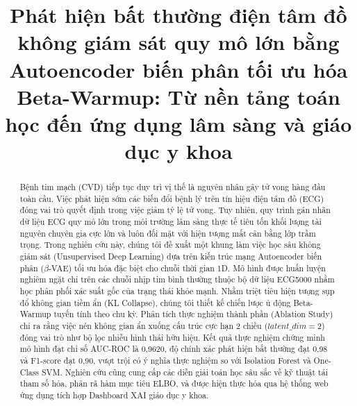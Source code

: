 \documentclass[conference]{IEEEtran}
\begin{document}
\title{Phát hiện bất thường điện tâm đồ không giám sát quy mô lớn bằng Autoencoder biến phân tối ưu hóa Beta-Warmup: Từ nền tảng toán học đến ứng dụng lâm sàng và giáo dục y khoa}

\author{
}

\maketitle

\begin{abstract}
Bệnh tim mạch (CVD) tiếp tục duy trì vị thế là nguyên nhân gây tử vong hàng đầu toàn cầu. Việc phát hiện sớm các biến đổi bệnh lý trên tín hiệu điện tâm đồ (ECG) đóng vai trò quyết định trong việc giảm tỷ lệ tử vong. Tuy nhiên, quy trình gán nhãn dữ liệu ECG quy mô lớn trong môi trường lâm sàng thực tế tiêu tốn khối lượng tài nguyên chuyên gia cực lớn và luôn đối mặt với hiện tượng mất cân bằng lớp trầm trọng. Trong nghiên cứu này, chúng tôi đề xuất một khung làm việc học sâu không giám sát (Unsupervised Deep Learning) dựa trên kiến trúc mạng Autoencoder biến phân (\(\beta\)-VAE) tối ưu hóa đặc biệt cho chuỗi thời gian 1D. Mô hình được huấn luyện nghiêm ngặt chỉ trên các chuỗi nhịp tim bình thường thuộc bộ dữ liệu ECG5000 nhằm học phân phối xác suất gốc của trạng thái khỏe mạnh. Nhằm triệt tiêu hiện tượng sụp đổ không gian tiềm ẩn (KL Collapse), chúng tôi thiết kế chiến lược ủ động Beta-Warmup tuyến tính theo chu kỳ. Phân tích thực nghiệm thành phần (Ablation Study) chỉ ra rằng việc nén không gian ẩn xuống cấu trúc cực hạn 2 chiều (\(latent\_dim=2\)) đóng vai trò như bộ lọc nhiễu hình thái hữu hiệu. Kết quả thực nghiệm chứng minh mô hình đạt chỉ số AUC-ROC là 0,9620, độ chính xác phát hiện bất thường đạt 0,98 và F1-score đạt 0,90, vượt trội có ý nghĩa thực nghiệm so với Isolation Forest và One-Class SVM. Nghiên cứu cũng cung cấp các diễn giải toán học sâu sắc về kỹ thuật tái tham số hóa, phân rã hàm mục tiêu ELBO, và được hiện thực hóa qua hệ thống web ứng dụng tích hợp Dashboard XAI giáo dục y khoa.
\end{abstract}
\end{document}
